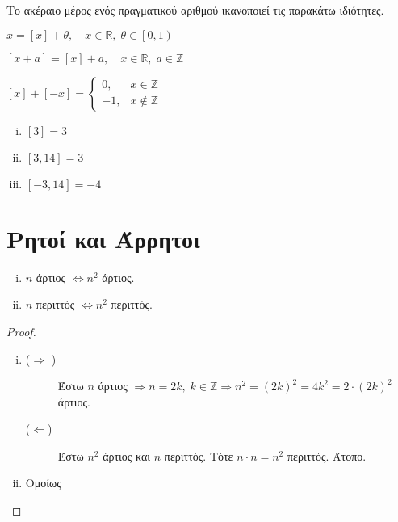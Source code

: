 \documentclass[main.tex]{subfiles}
\begin{document}
Το ακέραιο μέρος ενός πραγματικού αριθμού ικανοποιεί τις παρακάτω ιδιότητες.
\begin{myitemize}
  \item $ x = [x]+ \theta, \quad x \in \mathbb{R}, \; \theta \in \left[0,1\right) $
  \item $ [x+a]= [x] + a, \quad x \in \mathbb{R}, \; a \in \mathbb{Z} $
  \item $ [x]+[-x] = 
    \begin{cases} 
      0, & x \in \mathbb{Z} \\
      -1, & x \not \in \mathbb{Z}
    \end{cases}$
\end{myitemize}

\begin{example}
\item {}
  \begin{enumerate}[(i)]
    \item $ [3]=3 $
    \item $ [3,14] = 3  $
    \item $ [-3,14] =-4 $
  \end{enumerate}
\end{example}

\section{Ρητοί και Άρρητοι}

\begin{lem}
\item {}
  \begin{enumerate}[(i)]
    \item $n$ άρτιος $ \Leftrightarrow n^{2} $ άρτιος.
    \item $ n $ περιττός $ \Leftrightarrow n^{2} $ περιττός.
  \end{enumerate}
\end{lem}

\begin{proof}
\item {}
  \begin{enumerate}[(i)]
    \item 
      \begin{description}
        \item [($ \Rightarrow $ )] 
          Έστω $ n $ άρτιος $ \Rightarrow n =2k, \; k \in \mathbb{Z} 
          \Rightarrow n^{2} = (2k)^{2} = 4k^{2} = 2\cdot (2k)^{2} $ άρτιος. 
        \item [($ \Leftarrow $)] Έστω $ n^{2} $ άρτιος και $n$ περιττός. Τότε 
          $ n \cdot n = n^{2} $ περιττός. Άτοπο.
      \end{description}

    \item Ομοίως
  \end{enumerate}
\end{proof}
\end{document}
